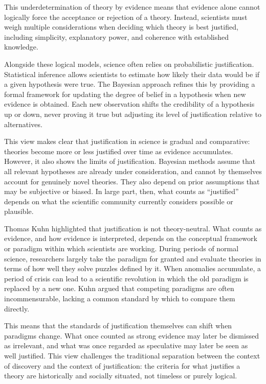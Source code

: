 This underdetermination of theory by evidence means that evidence alone cannot logically force the acceptance or rejection of a theory. Instead, scientists must weigh multiple considerations when deciding which theory is best justified, including simplicity, explanatory power, and coherence with established knowledge.

Alongside these logical models, science often relies on probabilistic justification. Statistical inference allows scientists to estimate how likely their data would be if a given hypothesis were true. The Bayesian approach refines this by providing a formal framework for updating the degree of belief in a hypothesis when new evidence is obtained. Each new observation shifts the credibility of a hypothesis up or down, never proving it true but adjusting its level of justification relative to alternatives.

This view makes clear that justification in science is gradual and comparative: theories become more or less justified over time as evidence accumulates. However, it also shows the limits of justification. Bayesian methods assume that all relevant hypotheses are already under consideration, and cannot by themselves account for genuinely novel theories. They also depend on prior assumptions that may be subjective or biased. In large part, then, what counts as “justified” depends on what the scientific community currently considers possible or plausible.

Thomas Kuhn highlighted that justification is not theory-neutral. What counts as evidence, and how evidence is interpreted, depends on the conceptual framework or paradigm within which scientists are working. During periods of normal science, researchers largely take the paradigm for granted and evaluate theories in terms of how well they solve puzzles defined by it. When anomalies accumulate, a period of crisis can lead to a scientific revolution in which the old paradigm is replaced by a new one. Kuhn argued that competing paradigms are often incommensurable, lacking a common standard by which to compare them directly.

This means that the standards of justification themselves can shift when paradigms change. What once counted as strong evidence may later be dismissed as irrelevant, and what was once regarded as speculative may later be seen as well justified. This view challenges the traditional separation between the context of discovery and the context of justification: the criteria for what justifies a theory are historically and socially situated, not timeless or purely logical.

